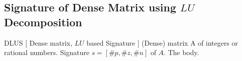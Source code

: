 \subsection{Signature of Dense Matrix using $LU$ Decomposition}
\begin{algorithm}{DLUS $[$ Dense matrix, $LU$ based Signature $]$}
\Inspec (Dense) matrix A of integers or rational numbers.
\Outspec Signature $s = [\#p, \#z, \#n]$ of $A$.
\Stmt[1.] The body.\\
\end{algorithm}
